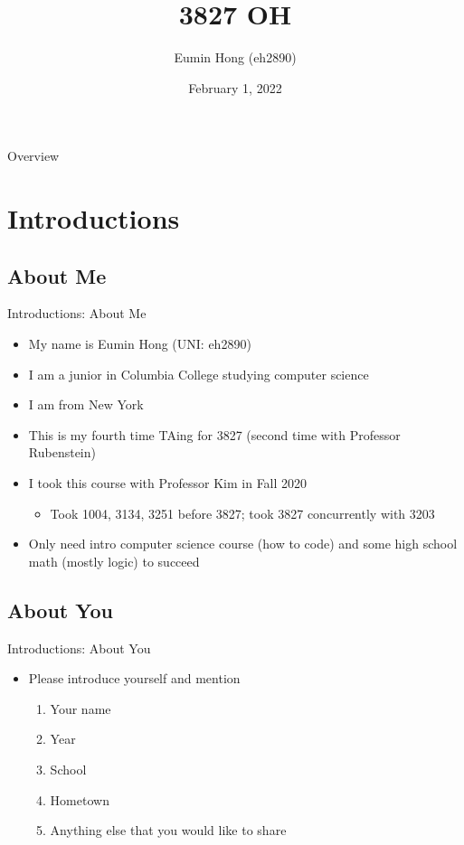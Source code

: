 \documentclass{../slides}
\title{3827 OH}
\author{Eumin Hong (eh2890)}
\institute{Columbia University}
\date{February 1, 2022}
\begin{document}
\begin{frame}
    \titlepage
\end{frame}

\begin{frame}{Overview}
\begin{multicols}{2}
\tableofcontents
\end{multicols}
\end{frame}

\section{Introductions}
\subsection{About Me}
\begin{frame}{Introductions: About Me}
    \begin{itemize}
        \item My name is Eumin Hong (UNI: eh2890)
        \item I am a junior in Columbia College studying computer science
        \item I am from New York
        \item This is my fourth time TAing for 3827 (second time with Professor Rubenstein)
        \item I took this course with Professor Kim in Fall 2020
        \begin{itemize}
            \item Took 1004, 3134, 3251 before 3827; took 3827 concurrently with 3203
        \end{itemize}
        \item Only need intro computer science course (how to code) and some high school math (mostly logic) to succeed
    \end{itemize}
\end{frame}

\subsection{About You}
\begin{frame}{Introductions: About You}
    \begin{itemize}
        \item Please introduce yourself and mention
        \begin{enumerate}
            \item Your name
            \item Year
            \item School
            \item Hometown
            \item Anything else that you would like to share
        \end{enumerate}
    \end{itemize}
\end{frame}
\end{document}
